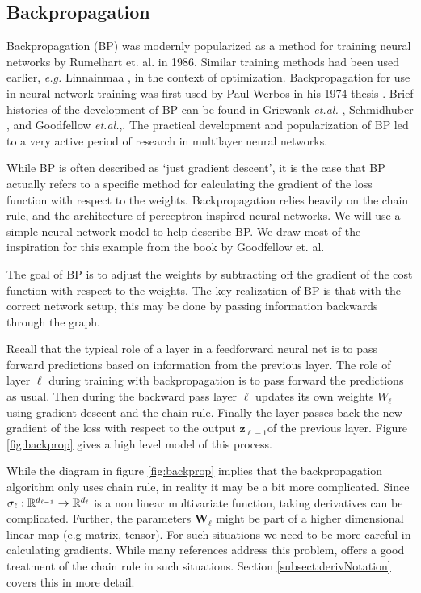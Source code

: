 \subsection{Backpropagation}\label{subsect:backprop}
Backpropagation (BP) was modernly popularized as a method for training neural networks by Rumelhart et. al. \cite{rumelhart1986learning} in 1986. Similar training methods had been used earlier, \textit{e.g.} Linnainmaa \cite{Linnainmaa1976}, in the context of optimization. Backpropagation for use in neural network training was first used by Paul Werbos in his 1974 thesis \cite{werbos1994roots}. Brief histories of the development of BP can be found in Griewank \textit{et.al.} \cite{griewank2008deriv}, Schmidhuber \cite{Schmidhuber_2015}, and Goodfellow \textit{et.al.},\cite[see ch6.6]{Goodfellow-et-al-2016}. The practical development and popularization of BP led to a very active period of research in multilayer neural networks.

While BP is often described as `just gradient descent', it is the case that BP actually refers to a specific method for calculating the gradient of the loss function with respect to the weights.  Backpropagation relies heavily on the chain rule, and the architecture of perceptron inspired neural networks. We will use a simple neural network model to help describe BP.  We draw most of the inspiration for this example from the book by Goodfellow  et. al. \cite[ch6.5]{Goodfellow-et-al-2016}

The goal of BP is to adjust the weights by subtracting off the gradient of the cost function with respect to the weights.  The key realization of BP is that with the correct network setup, this may be done by passing information backwards through the graph.  

Recall that the typical role of a layer in a feedforward neural net is to pass forward predictions based on information from the previous layer.  The role of layer \( \ell \) during training with backpropagation is to pass forward the predictions as usual. Then during the backward pass layer \( \ell \) updates its own weights \( W_{\ell} \) using gradient descent and the chain rule. Finally the layer passes back the new gradient of the loss with respect to the output \( \bm z_{\ell-1} \)of the previous layer.  Figure \ref{fig:backprop} gives a high level model of this process.



While the diagram in figure \ref{fig:backprop} implies that the backpropagation algorithm only uses chain rule, in reality it may be a bit more complicated.  Since \( \sigma_{\ell}:\mathbb R^{d_{\ell-1}}\rightarrow \mathbb R^{d_{\ell}}\) is a non linear multivariate function, taking derivatives can be complicated.  Further, the parameters \( \bm W_{\ell} \) might be part of a higher dimensional linear map (e.g matrix, tensor). For such situations we need to be more careful in calculating gradients.  While many references address this problem, \cite{matGradChain} offers a good treatment of the chain rule in such situations. Section \ref{subsect:derivNotation} covers this in more detail.


